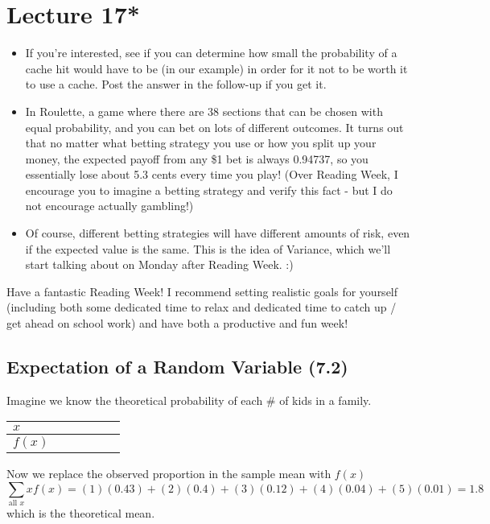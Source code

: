 \section{Lecture 17*}
\begin{itemize}
    \item If you're interested, see if you can determine how small the probability of a cache hit would have to be (in our example) in order for it not to be worth it to use a cache. Post the answer in the follow-up if you get it.
    \item In Roulette, a game where there are 38 sections that can be chosen with equal probability, and you can bet on lots of different outcomes. It turns out that no matter what betting strategy you use or how you split up your money, the expected payoff from any \$1 bet is always 0.94737, so you essentially lose about 5.3 cents every time you play! (Over Reading Week, I encourage you to imagine a betting strategy and verify this fact - but I do not encourage actually gambling!)
    \item Of course, different betting strategies will have different amounts of risk, even if the expected value is the same. This is the idea of Variance, which we'll start talking about on Monday after Reading Week. :)
\end{itemize}

Have a fantastic Reading Week! I recommend setting realistic goals for yourself (including both some dedicated time to relax and dedicated time to catch up / get ahead on school work) and have both a productive and fun week!

\subsection{Expectation of a Random Variable (7.2)}
Imagine we know the theoretical probability of each
\# of kids in a family.

\begin{tabular}{| *{6}{>{\centering\arraybackslash}p{1cm} |}}
    \hline
    $x$ & 1 & 2 & 3 & 4 & 5\\
    \hline
    $f(x)$ & 0.43 & 0.4 & 0.12 & 0.04 & 0.01\\
    \hline
\end{tabular}

Now we replace the observed proportion in the sample mean
with $ f(x) $
\[ \sum\limits_{\text{all } x} x f(x)=(1)(0.43)+(2)(0.4)+
(3)(0.12)+(4)(0.04)+(5)(0.01)=1.8 \]
which is the theoretical mean.

